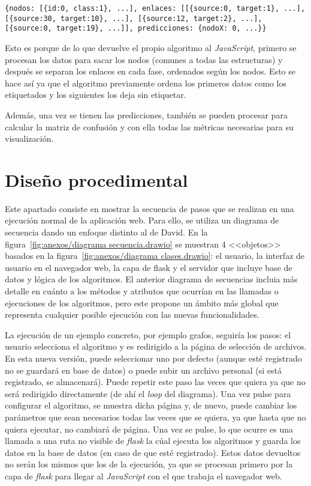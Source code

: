 \texttt{\{nodos: [\{id:0, class:1\}, ...], enlaces: [[\{source:0, target:1\}, ...], [\{source:30, target:10\}, ...], [\{source:12, target:2\}, ...], [\{source:0, target:19\}, ...]], predicciones: \{nodoX: 0, ...\}\}}

Esto es porque de lo que devuelve el propio algoritmo al \textit{JavaScript}, primero se procesan los datos para sacar los nodos (comunes a todas las estructuras) y después se separan los enlaces en cada fase, ordenados según los nodos. Esto se hace así ya que el algoritmo previamente ordena los primeros datos como los etiquetados y los siguientes los deja sin etiquetar.

Además, una vez se tienen las predicciones, también se pueden procesar para calcular la matriz de confusión y con ella todas las métricas necesarias para su visualización. 
\section{Diseño procedimental}
Este apartado consiste en mostrar la secuencia de pasos que se realizan en una ejecución normal de la aplicación web. Para ello, se utiliza un diagrama de secuencia dando un enfoque distinto al de David. En la figura~\ref{fig:anexos/diagrama secuencia.drawio} se muestran 4 <<objetos>> basados en la figura~\ref{fig:anexos/diagrama clases.drawio}: el usuario, la interfaz de usuario en el navegador web, la capa de flask y el servidor que incluye base de datos y lógica de los algoritmos. El anterior diagrama de secuencias incluia más detalle en cuánto a los métodos y atributos que ocurrían en las llamadas o ejecuciones de los algoritmos, pero este propone un ámbito más global que representa cualquier posible ejecución con las nuevas funcionalidades.

La ejecución de un ejemplo concreto, por ejemplo grafos, seguiría los pasos: el usuario selecciona el algoritmo y es redirigido a la página de selección de archivos. En esta nueva versión, puede seleccionar uno por defecto (aunque esté registrado no se guardará en base de datos) o puede subir un archivo personal (si está registrado, se almacenará). Puede repetir este paso las veces que quiera ya que no será redirigido directamente (de ahí el \textit{loop} del diagrama). Una vez pulse para configurar el algoritmo, se muestra dicha página y, de nuevo, puede cambiar los parámetros que sean necesarios todas las veces que se quiera, ya que hasta que no quiera ejecutar, no cambiará de página. Una vez se pulse, lo que ocurre es una llamada a una ruta no visible de \textit{flask} la cúal ejecuta los algoritmos y guarda los datos en la base de datos (en caso de que esté registrado). Estos datos devueltos no serán los mismos que los de la ejecución, ya que se procesan primero por la capa de \textit{flask} para llegar al \textit{JavaScript} con el que trabaja el navegador web.

